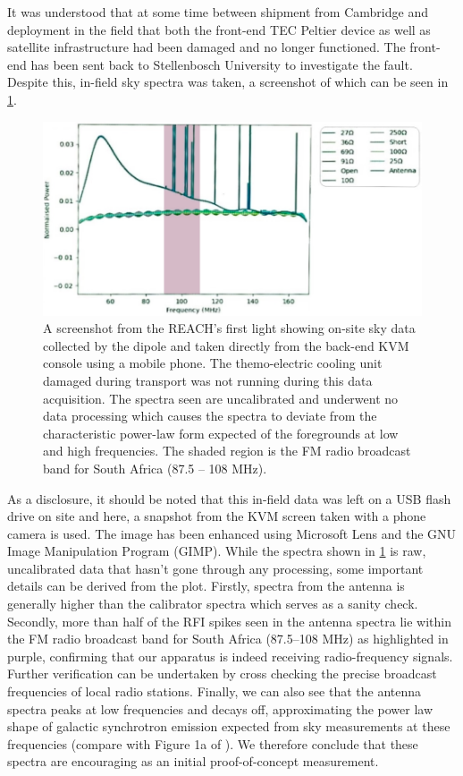 It was understood that at some time between shipment from Cambridge and deployment in the field that both the front-end TEC Peltier device as well as satellite infrastructure had been damaged and no longer functioned. The front-end has been sent back to Stellenbosch University to investigate the fault. Despite this, in-field sky spectra was taken, a screenshot of which can be seen in \cref{fig:onsite_data}.
\begin{figure}
    \centering
    \includegraphics[scale=0.4]{onsite_data}
    \caption{A screenshot from the REACH's first light showing on-site sky data collected by the dipole and taken directly from the back-end KVM console using a mobile phone. The themo-electric cooling unit damaged during transport was not running during this data acquisition. The spectra seen are uncalibrated and underwent no data processing which causes the spectra to deviate from the characteristic power-law form expected of the foregrounds at low and high frequencies. The shaded region is the FM radio broadcast band for South Africa (87.5 -- 108 MHz).}
    \label{fig:onsite_data}
\end{figure}
As a disclosure, it should be noted that this in-field data was left on a USB flash drive on site and here, a snapshot from the KVM screen taken with a phone camera is used. The image has been enhanced using Microsoft Lens and the GNU Image Manipulation Program (GIMP). While the spectra shown in \cref{fig:onsite_data} is raw, uncalibrated data that hasn't gone through any processing, some important details can be derived from the plot. Firstly, spectra from the antenna is generally higher than the calibrator spectra which serves as a sanity check. Secondly, more than half of the RFI spikes seen in the antenna spectra lie within the FM radio broadcast band for South Africa (87.5--108 MHz) as highlighted in purple, confirming that our apparatus is indeed receiving radio-frequency signals. Further verification can be undertaken by cross checking the precise broadcast frequencies of local radio stations. Finally, we can also see that the antenna spectra peaks at low frequencies and decays off, approximating the power law shape of galactic synchrotron emission expected from sky measurements at these frequencies (compare with Figure 1a of \citet{edgesNature}). We therefore conclude that these spectra are encouraging as an initial proof-of-concept measurement.

